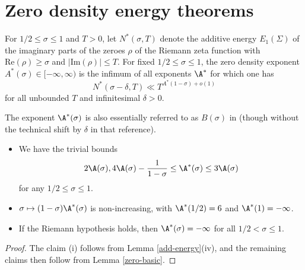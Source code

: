 \chapter{Zero density energy theorems}\label{zero-density-energy-chapter}


\begin{definition}\label{zeroe-def}  For $1/2 \leq \sigma \leq 1$ and $T>0$, let $N^*(\sigma,T)$ denote the additive energy $E_1(\Sigma)$ of the imaginary parts of the zeroes $\rho$ of the Riemann zeta function with $\mathrm{Re}(\rho) \geq \sigma$ and $|\mathrm{Im}(\rho)| \leq T$.  For fixed $1/2 \leq \sigma \leq 1$, the zero density exponent $A^*(\sigma) \in [-\infty,\infty)$ is the infimum of all exponents $\A^*$ for which one has
    $$ N^*(\sigma-\delta,T) \ll T^{A^* (1-\sigma)+o(1)}$$
for all unbounded $T$ and infinitesimal $\delta>0$.
\end{definition}

The exponent $\A^*(\sigma)$ is also essentially referred to as $B(\sigma)$ in \cite{heath_brown_consecutive_II} (though without the technical shift by $\delta$ in that reference).


\begin{lemma}\label{zeroe-basic}
\begin{itemize}
\item[(i)] We have the trivial bounds
$$ 2\A(\sigma), 4\A(\sigma)-\frac{1}{1-\sigma} \leq \A^*(\sigma) \leq 3 \A(\sigma)$$
for any $1/2 \leq \sigma \leq 1$.
\item[(ii)] $\sigma \mapsto (1-\sigma) \A^*(\sigma)$ is non-increasing, with $\A^*(1/2)=6$ and $\A^*(1)=-\infty$.
\item[(iii)] If the Riemann hypothesis holds, then $\A^*(\sigma)=-\infty$ for all $1/2 < \sigma \leq 1$.
\end{itemize}
\end{lemma}


\begin{proof} The claim (i) follows from Lemma \ref{add-energy}(iv), and the remaining claims then follow from Lemma \ref{zero-basic}.\end{proof}

